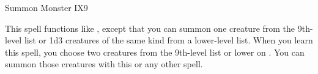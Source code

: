\begin{spellsection}{Summon Monster IX}{9}
\begin{spellheader}
\end{spellheader}
\begin{spellcontent}
    \spelleffect This spell functions like , except that you can summon one creature from the 9th-level list or 1d3 creatures of the same kind from a lower-level list. When you learn this spell, you choose two creatures from the 9th-level list or lower on . You can summon those creatures with this or any other  spell.

    \spelldur \durshort \dismissable
\end{spellcontent}
\begin{spellfooter}
\end{spellfooter}
\end{spellsection}
